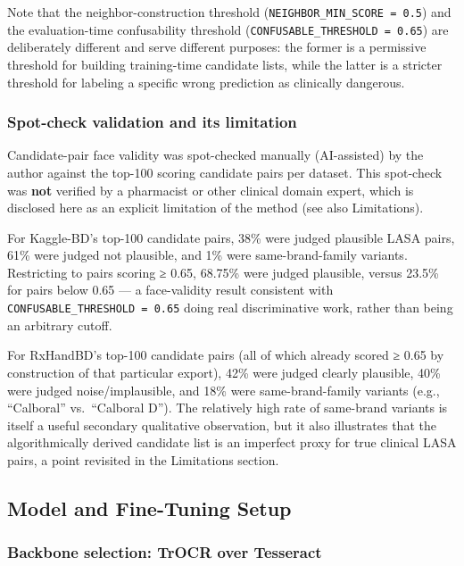 \documentclass[fleqn,10pt]{wlpeerj}
\begin{document}
Note that the neighbor-construction threshold (\texttt{NEIGHBOR\_MIN\_SCORE\ =\ 0.5}) and the evaluation-time confusability threshold (\texttt{CONFUSABLE\_THRESHOLD\ =\ 0.65}) are deliberately different and serve different purposes: the former is a permissive threshold for building training-time candidate lists, while the latter is a stricter threshold for labeling a specific wrong prediction as clinically dangerous.

\subsubsection*{Spot-check validation and its limitation}\label{sec:spot-check}

Candidate-pair face validity was spot-checked manually (AI-assisted) by the author against the top-100 scoring candidate pairs per dataset. This spot-check was \textbf{not} verified by a pharmacist or other clinical domain expert, which is disclosed here as an explicit limitation of the method (see also Limitations).

For Kaggle-BD's top-100 candidate pairs, 38\% were judged plausible LASA pairs, 61\% were judged not plausible, and 1\% were same-brand-family variants. Restricting to pairs scoring ≥ 0.65, 68.75\% were judged plausible, versus 23.5\% for pairs below 0.65 --- a face-validity result consistent with \texttt{CONFUSABLE\_THRESHOLD\ =\ 0.65} doing real discriminative work, rather than being an arbitrary cutoff.

For RxHandBD's top-100 candidate pairs (all of which already scored ≥ 0.65 by construction of that particular export), 42\% were judged clearly plausible, 40\% were judged noise/implausible, and 18\% were same-brand-family variants (e.g., ``Calboral'' vs.\ ``Calboral D''). The relatively high rate of same-brand variants is itself a useful secondary qualitative observation, but it also illustrates that the algorithmically derived candidate list is an imperfect proxy for true clinical LASA pairs, a point revisited in the Limitations section.

\subsection*{Model and Fine-Tuning Setup}\label{sec:model-finetuning}

\subsubsection*{Backbone selection: TrOCR over Tesseract}\label{sec:backbone-selection}
\end{document}
